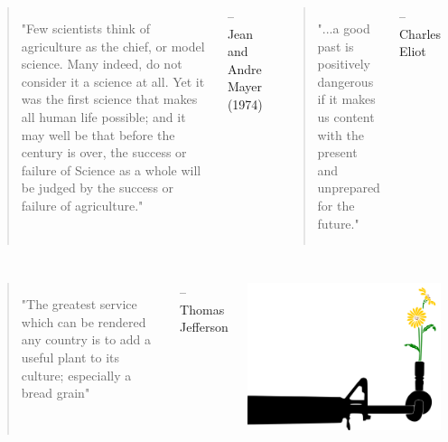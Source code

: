 \documentclass[11pt,ignorenonframetext,aspectratio=169]{beamer}
\newcommand{\bcolumns}{\begin{columns}[T, onlytextwidth]}
\newcommand{\ecolumns}{\end{columns}}
\begin{document}
\begin{frame}{}
\protect\hypertarget{section-1}{}
\bcolumns
{}
\begin{quote}
\vfill
\small
"Few scientists think of agriculture as the chief, or model science. Many indeed, do not consider it a science at all. Yet it was the first science that makes all human life possible; and it may well be that before the century is over, the success or failure of Science as a whole will be judged by the success or failure of agriculture."
\end{quote}

\hfill

\raggedright

\footnotesize -- Jean and Andre Mayer (1974) 

\begin{quote}
\vfill
"...a good past is positively dangerous if it makes us content with the present and unprepared for the future."
\end{quote}

\hfill

\raggedright

\footnotesize -- Charles Eliot \ecolumns
\end{frame}

\begin{frame}{}
\protect\hypertarget{section-2}{}
\begin{columns}[T,c,onlytextwidth]

\begin{quote}
\vfill
"The greatest service which can be rendered any country is to add a useful plant to its culture; especially a bread grain"
\end{quote}
\hfill\raggedright \footnotesize -- Thomas Jefferson



\begin{center}\includegraphics[width=0.8\linewidth]{./images/giving_peace_a_chance} \end{center}

\end{columns}
\end{frame}
\end{document}
